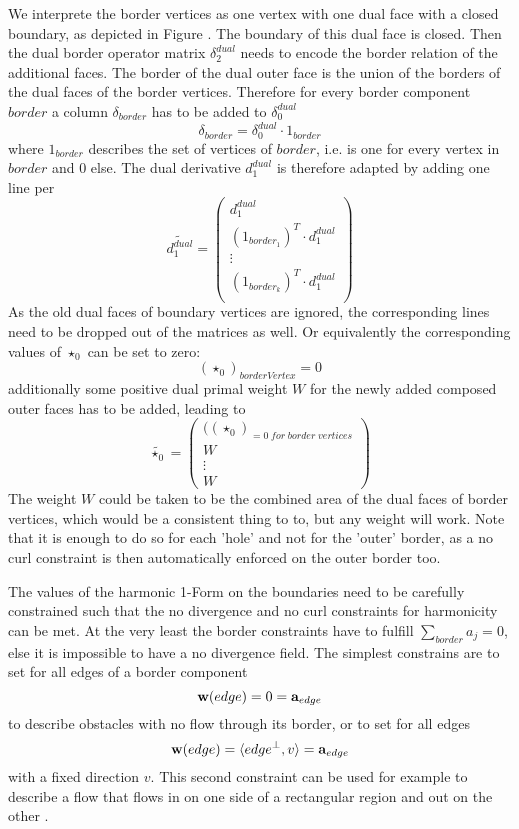 We interprete the border vertices as one vertex with one dual face with a closed boundary, as depicted in Figure . The boundary of this dual face is closed. Then the dual border operator matrix $\delta^{dual}_2$ needs to encode the border relation of the additional faces. The border of the dual outer face is the union of the borders of the dual faces of the border vertices. Therefore for every border component $border$ a column $\delta_{border}$ has to be added to $\delta_0^{dual}$
\[\delta_{border} = \delta_0^{dual} \cdot 1_{border}\]
where $1_{border}$ describes the set of vertices of $border$, i.e. is one for every vertex in $border$ and 0 else.
The dual derivative $d_1^{dual}$ is therefore adapted by adding one line per 
\[\widetilde{d_1^{dual}} = \begin{pmatrix} d_1^{dual} \\
(1_{border_1})^T \cdot d_1^{dual} \\
\vdots \\
(1_{border_k})^T \cdot d_1^{dual} \\
\end{pmatrix}\]
As the old dual faces of boundary vertices are ignored, the corresponding lines need to be dropped out of the matrices as well. Or equivalently the corresponding values of $\star_0$ can be set to zero:
\[(\star_0)_{borderVertex} = 0\]
additionally some positive dual primal weight $W$ for the newly added composed outer faces has to be added, leading to
\[\widetilde{\star_0} = \begin{pmatrix}((\star_0)_{=0\;for\; border\; vertices} \\
W\\
\vdots \\
W \end{pmatrix}\]
The weight $W$ could be taken to be the combined area of the dual faces of border vertices, which would be a consistent thing to to, but any weight will work.
Note that it is enough to do so for each 'hole' and not for the 'outer' border, as a no curl constraint is then automatically enforced on the outer border too.

The values of the harmonic 1-Form on the boundaries need to be carefully constrained such that the no divergence and no curl constraints for harmonicity can be met. At the very least the border constraints have to fulfill $\sum_{border} a_j = 0$, else it is impossible to have a no divergence field. The simplest constrains are to set for all edges of a border component
\begin{equation}\textbf{w}(edge) = 0 = \textbf{a}_{edge} \label{eq:fsobstacle}\end{equation}
to describe obstacles with no flow through its border, or to set for all edges
\begin{equation}\textbf{w}(edge) = \langle edge^\perp, v\rangle= \textbf{a}_{edge} \label{eq:fspermeable}\end{equation}
with a fixed direction $v$. This second constraint can be used for example to describe a flow that flows in on one side of a rectangular region and out on the other . 

